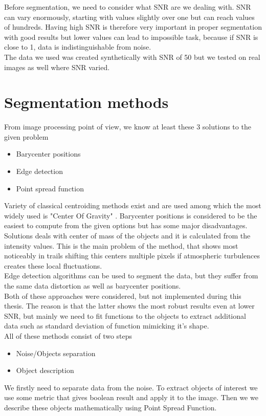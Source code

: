 \documentclass[12pt, a4paper, oneside]{book}
\begin{document}
Before segmentation, we need to consider what SNR are we dealing with.
SNR can vary enormously, starting with values slightly over one but can reach values of hundreds.
Having high SNR is therefore very important in proper segmentation with good results but lower values can lead to impossible task, because if SNR is close to 1, data is indistinguishable from noise.\\
The data we used was created synthetically with SNR of 50 but we tested on real images as well where SNR varied.

\section{Segmentation methods}

From image processing point of view, we know at least these 3 solutions to the given problem \cite{kouprianov}

\begin{itemize}
    \item Barycenter positions
    \item Edge detection
    \item Point spread function
\end{itemize}
Variety of classical centroiding methods exist and are used among which the most widely used is "Center Of Gravity" \cite{wang} \cite{flewelling}.
Barycenter positions is considered to be the easiest to compute from the given options but has some major disadvantages.
Solutions deals with center of mass of the objects and it is calculated from the intensity values.
This is the main problem of the method, that shows most noticeably in trails shifting this centers multiple pixels if atmospheric turbulences creates these local fluctuations.
\\
Edge detection algorithms can be used to segment the data, but they suffer from the same data distortion as well as barycenter positions.\\
Both of these approaches were considered, but not implemented during this thesis.
The reason is that the latter shows the most robust results even at lower SNR, but mainly we need to fit functions to the objects to extract additional data such as standard deviation of function mimicking it's shape.\\
All of these methods consist of two steps
\begin{itemize}
    \item Noise/Objects separation
    \item Object description
\end{itemize}
We firstly need to separate data from the noise.
To extract objects of interest we use some metric that gives boolean result and apply it to the image.
Then we we describe these objects mathematically using Point Spread Function.
\end{document}

